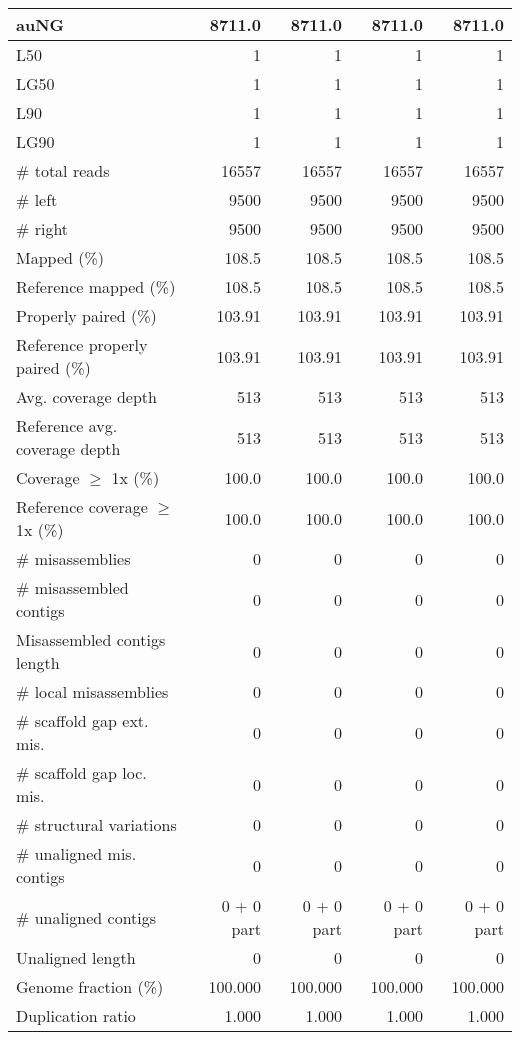 \documentclass[12pt,a4paper]{article}
\begin{document}
\begin{table}[ht]
\begin{center}
\begin{tabular}{|l*{4}{|r}|}
auNG & 8711.0 & 8711.0 & 8711.0 & 8711.0 \\ \hline
L50 & 1 & 1 & 1 & 1 \\ \hline
LG50 & 1 & 1 & 1 & 1 \\ \hline
L90 & 1 & 1 & 1 & 1 \\ \hline
LG90 & 1 & 1 & 1 & 1 \\ \hline
\# total reads & 16557 & 16557 & 16557 & 16557 \\ \hline
\# left & 9500 & 9500 & 9500 & 9500 \\ \hline
\# right & 9500 & 9500 & 9500 & 9500 \\ \hline
Mapped (\%) & 108.5 & 108.5 & 108.5 & 108.5 \\ \hline
Reference mapped (\%) & 108.5 & 108.5 & 108.5 & 108.5 \\ \hline
Properly paired (\%) & 103.91 & 103.91 & 103.91 & 103.91 \\ \hline
Reference properly paired (\%) & 103.91 & 103.91 & 103.91 & 103.91 \\ \hline
Avg. coverage depth & 513 & 513 & 513 & 513 \\ \hline
Reference avg. coverage depth & 513 & 513 & 513 & 513 \\ \hline
Coverage $\geq$ 1x (\%) & 100.0 & 100.0 & 100.0 & 100.0 \\ \hline
Reference coverage $\geq$ 1x (\%) & 100.0 & 100.0 & 100.0 & 100.0 \\ \hline
\# misassemblies & 0 & 0 & 0 & 0 \\ \hline
\# misassembled contigs & 0 & 0 & 0 & 0 \\ \hline
Misassembled contigs length & 0 & 0 & 0 & 0 \\ \hline
\# local misassemblies & 0 & 0 & 0 & 0 \\ \hline
\# scaffold gap ext. mis. & 0 & 0 & 0 & 0 \\ \hline
\# scaffold gap loc. mis. & 0 & 0 & 0 & 0 \\ \hline
\# structural variations & 0 & 0 & 0 & 0 \\ \hline
\# unaligned mis. contigs & 0 & 0 & 0 & 0 \\ \hline
\# unaligned contigs & 0 + 0 part & 0 + 0 part & 0 + 0 part & 0 + 0 part \\ \hline
Unaligned length & 0 & 0 & 0 & 0 \\ \hline
Genome fraction (\%) & 100.000 & 100.000 & 100.000 & 100.000 \\ \hline
Duplication ratio & 1.000 & 1.000 & 1.000 & 1.000 \\ \hline

\end{tabular}
\end{center}
\end{table}
\end{document}
